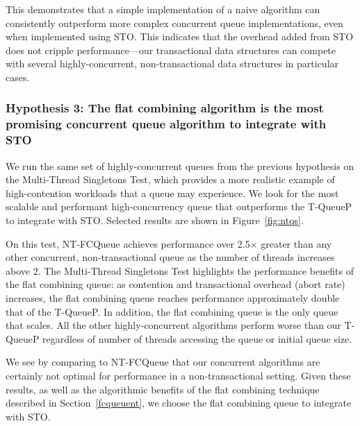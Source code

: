 This demonstrates that a simple implementation of a naive algorithm can consistently outperform more complex concurrent queue implementations, even when implemented using STO. This indicates that the overhead added from STO does not cripple performance---our transactional data structures can compete with several highly-concurrent, non-transactional data structures in particular cases. 

\vspace{12pt}
\noindent{}

\subsubsection{Hypothesis 3: The flat combining algorithm is the most promising concurrent queue algorithm to integrate with STO}
\label{eval:hypo3}

We run the same set of highly-concurrent queues from the previous hypothesis on the Multi-Thread Singletons Test, which provides a more realistic example of high-contention workloads that a queue may experience. We look for the most scalable and performant high-concurrency queue that outperforms the T-QueueP to integrate with STO. Selected results are shown in Figure~\ref{fig:ntqs}.

On this test, NT-FCQueue achieves performance over 2.5$\times$ greater than any other concurrent, non-transactional queue as the number of threads increases above 2. The Multi-Thread Singletons Test highlights the performance benefits of the flat combining queue: as contention and transactional overhead (abort rate) increases, the flat combining queue reaches performance approximately double that of the T-QueueP. In addition, the flat combining queue is the only queue that scales. All the other highly-concurrent algorithms perform worse than our T-QueueP regardless of number of threads accessing the queue or initial queue size.

We see by comparing to NT-FCQueue that our concurrent algorithms are certainly not optimal for performance in a non-transactional setting.
Given these results, as well as the algorithmic benefits of the flat combining technique described in Section~\ref{fcqueuent}, we choose the flat combining queue to integrate with STO.

